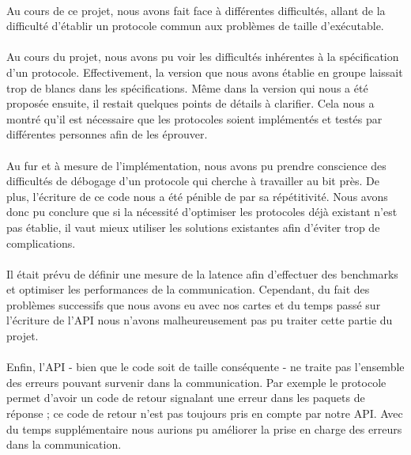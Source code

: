 \paragraph{}
Au cours de ce projet, nous avons fait face à différentes difficultés, allant
de la difficulté d'établir un protocole commun aux problèmes de taille
d'exécutable.

\paragraph{}
Au cours du projet, nous avons pu voir les difficultés inhérentes à la
spécification d'un protocole. Effectivement, la version que nous avons établie
en groupe laissait trop de blancs dans les spécifications. Même dans la
version qui nous a été proposée ensuite, il restait quelques points de détails
à clarifier. Cela nous a montré qu'il est nécessaire que les protocoles
soient implémentés et testés par différentes personnes afin de les éprouver.

\paragraph{}
Au fur et à mesure de l'implémentation, nous avons pu prendre conscience des
difficultés de débogage d'un protocole qui cherche à travailler au bit près.
De plus, l'écriture de ce code nous a été pénible de par sa répétitivité. Nous
avons donc pu conclure que si la nécessité d'optimiser les protocoles déjà
existant n'est pas établie, il vaut mieux utiliser les solutions existantes
afin d'éviter trop de complications.

\paragraph{}
Il était prévu de définir une mesure de la latence afin d'effectuer des
benchmarks et optimiser les performances de la communication. Cependant, du
fait des problèmes successifs que nous avons eu avec nos cartes et du temps
passé sur l'écriture de l'API nous n'avons malheureusement pas pu traiter
cette partie du projet.

\paragraph{}
Enfin, l'API - bien que le code soit de taille conséquente - ne traite pas
l'ensemble des erreurs pouvant survenir dans la communication. Par exemple le
protocole permet d'avoir un code de retour signalant une erreur dans les
paquets de réponse ; ce code de retour n'est pas toujours pris en compte par
notre API. Avec du temps supplémentaire nous aurions pu améliorer la prise en
charge des erreurs dans la communication.
